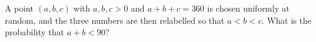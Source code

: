 A point $(a,b,c)$ with $a,b,c>0$ and $a+b+c=360$ is chosen uniformly at random, and the three numbers are then relabelled so that $a<b<c$. What is the probability that $a+b<90$?
